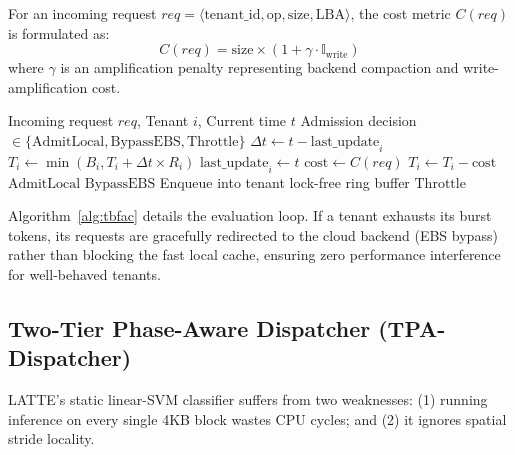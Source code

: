 \documentclass[10pt,twocolumn]{article}
\begin{document}
For an incoming request $req = \langle \text{tenant\_id}, \text{op}, \text{size}, \text{LBA} \rangle$, the cost metric $C(req)$ is formulated as:
\begin{equation}
    C(req) = \text{size} \times \left(1 + \gamma \cdot \mathbb{I}_{\text{write}}\right)
\end{equation}
where $\gamma$ is an amplification penalty representing backend compaction and write-amplification cost.

\begin{algorithm}[t]
\caption{Lock-Free T-BFAC Admission Control}
\label{alg:tbfac}
\small
\begin{algorithmic}[1]
\REQUIRE Incoming request $req$, Tenant $i$, Current time $t$
\ENSURE Admission decision $\in \{\text{AdmitLocal}, \text{BypassEBS}, \text{Throttle}\}$
\STATE $\Delta t \leftarrow t - \text{last\_update}_i$
\STATE $T_i \leftarrow \min(B_i, T_i + \Delta t \times R_i)$
\STATE $\text{last\_update}_i \leftarrow t$
\STATE $\text{cost} \leftarrow C(req)$
    \STATE $T_i \leftarrow T_i - \text{cost}$
    \RETURN $\text{AdmitLocal}$
    \RETURN $\text{BypassEBS}$
\ELSE
    \STATE Enqueue into tenant lock-free ring buffer
    \RETURN $\text{Throttle}$
\ENDIF
\end{algorithmic}
\end{algorithm}

Algorithm~\ref{alg:tbfac} details the evaluation loop. If a tenant exhausts its burst tokens, its requests are gracefully redirected to the cloud backend (EBS bypass) rather than blocking the fast local cache, ensuring zero performance interference for well-behaved tenants.

\subsection{Two-Tier Phase-Aware Dispatcher (TPA-Dispatcher)}
LATTE's static linear-SVM classifier suffers from two weaknesses: (1) running inference on every single 4KB block wastes CPU cycles; and (2) it ignores spatial stride locality.
\end{document}

